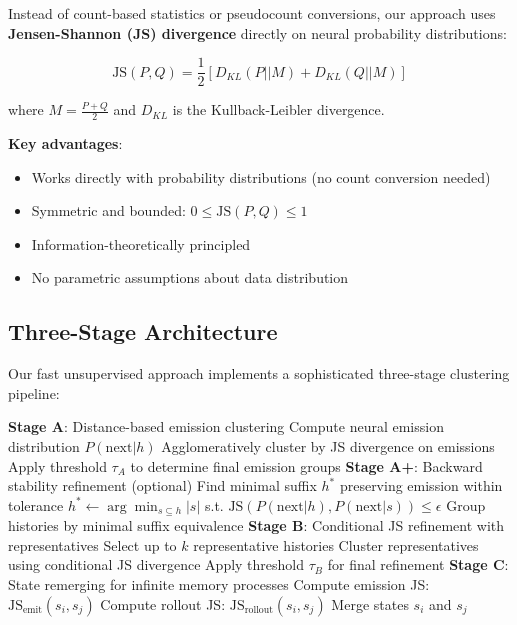 \documentclass[11pt]{article}
\begin{document}
\begin{notebox}
Instead of count-based statistics or pseudocount conversions, our approach uses \textbf{Jensen-Shannon (JS) divergence} directly on neural probability distributions:

$$\text{JS}(P, Q) = \frac{1}{2}\left[D_{KL}(P||M) + D_{KL}(Q||M)\right]$$

where $M = \frac{P + Q}{2}$ and $D_{KL}$ is the Kullback-Leibler divergence.

\textbf{Key advantages}:
\begin{itemize}
\item Works directly with probability distributions (no count conversion needed)
\item Symmetric and bounded: $0 \leq \text{JS}(P,Q) \leq 1$
\item Information-theoretically principled
\item No parametric assumptions about data distribution
\end{itemize}
\end{notebox}

\subsection{Three-Stage Architecture}

Our fast unsupervised approach implements a sophisticated three-stage clustering pipeline:

\begin{codebox}
\begin{algorithmic}
\STATE \textbf{Stage A}: Distance-based emission clustering
    \STATE Compute neural emission distribution $P(\text{next}|h)$
\ENDFOR
\STATE Agglomeratively cluster by JS divergence on emissions
\STATE Apply threshold $\tau_A$ to determine final emission groups
\STATE
\STATE \textbf{Stage A+}: Backward stability refinement (optional)
        \STATE Find minimal suffix $h^*$ preserving emission within tolerance
        \STATE $h^* \leftarrow \arg\min_{s \subseteq h} |s|$ s.t. $\text{JS}(P(\text{next}|h), P(\text{next}|s)) \leq \epsilon$
    \ENDFOR
    \STATE Group histories by minimal suffix equivalence
\ENDFOR
\STATE
\STATE \textbf{Stage B}: Conditional JS refinement with representatives
    \STATE Select up to $k$ representative histories
    \STATE Cluster representatives using conditional JS divergence
    \STATE Apply threshold $\tau_B$ for final refinement
\ENDFOR
\STATE
\STATE \textbf{Stage C}: State remerging for infinite memory processes
    \STATE Compute emission JS: $\text{JS}_{\text{emit}}(s_i, s_j)$
    \STATE Compute rollout JS: $\text{JS}_{\text{rollout}}(s_i, s_j)$
        \STATE Merge states $s_i$ and $s_j$
    \ENDIF
\ENDFOR
\end{algorithmic}
\end{codebox}
\end{document}
